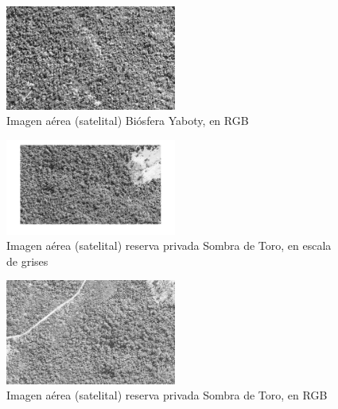 \begin{figure}[h!]
    \includegraphics[width=0.5\textwidth]{Imagenes/Homomorfico/YB2.jpg}
     \hfill
     \caption{Imagen aérea (satelital) Biósfera Yaboty, en RGB}
\end{figure}
\begin{figure}[h!]
    \includegraphics[width=0.5\textwidth]{Imagenes/Homomorfico/ST1_gris.png}
     \hfill
     \caption{Imagen aérea (satelital) reserva privada Sombra de Toro, en escala de grises}
\end{figure}
\begin{figure}[h!]
    \includegraphics[width=0.5\textwidth]{Imagenes/Homomorfico/ST2.png}
     \hfill
     \caption{Imagen aérea (satelital) reserva privada Sombra de Toro, en RGB}
\end{figure}
